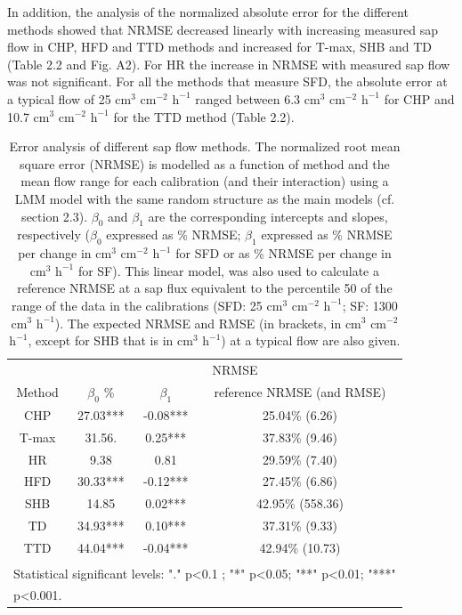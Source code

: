 \documentclass[11pt,twoside]{reedthesis}
\begin{document}
In addition, the analysis of the normalized absolute error for the
different methods showed that NRMSE decreased linearly with increasing
measured sap flow in CHP, HFD and TTD methods and increased for T-max,
SHB and TD (Table 2.2 and Fig. A2). For HR the increase in NRMSE with
measured sap flow was not significant. For all the methods that measure
SFD, the absolute error at a typical flow of 25 \(\text{cm}^3\)
\(\text{cm}^{-2}\) \(\text{h}^{-1}\) ranged between 6.3 \(\text{cm}^3\)
\(\text{cm}^{-2}\) \(\text{h}^{-1}\) for CHP and 10.7 \(\text{cm}^3\)
\(\text{cm}^{-2}\) \(\text{h}^{-1}\) for the TTD method (Table 2.2).\par
\begin{table}

\caption[Error analysis of different sap flow methods.]{\label{tab:Ch2T2}Error analysis of different sap flow methods. The normalized root mean square error (NRMSE) is modelled as a function of method and the mean flow range for each calibration (and their interaction) using a LMM model with the same random structure as the main models (cf. section 2.3). $\beta_0$ and $\beta_1$ are the corresponding intercepts and slopes, respectively ($\beta_0$ expressed as \% NRMSE; $\beta_1$ expressed as \% NRMSE per change in $\text{cm}^3$ $\text{cm}^{-2}$ $\text{h}^{-1}$ for SFD or as \% NRMSE per change in $\text{cm}^3$ $\text{h}^{-1}$ for SF). This linear model, was also used to calculate a reference NRMSE at a sap flux equivalent to the percentile 50 of the range of the data in the calibrations (SFD: 25 $\text{cm}^3$ $\text{cm}^{-2}$ $\text{h}^{-1}$; SF: 1300 $\text{cm}^3$ $\text{h}^{-1}$). The expected NRMSE and RMSE (in brackets, in $\text{cm}^3$ $\text{cm}^{-2}$ $\text{h}^{-1}$, except for SHB that is in $\text{cm}^3$ $\text{h}^{-1}$) at a typical flow are also given.}
\centering
\fontsize{10}{12}\selectfont
\begin{tabular}[t]{cccc}
\toprule
\multicolumn{1}{c}{ } & \multicolumn{3}{c}{NRMSE} \\
\cmidrule(l{3pt}r{3pt}){2-4}
Method & $\beta_0$\; \% & $\beta_1$ & reference NRMSE (and RMSE)\\
\midrule
CHP & 27.03*** & -0.08*** & 25.04\% (6.26)\\
T-max & 31.56. & 0.25*** & 37.83\% (9.46)\\
HR & 9.38 & 0.81 & 29.59\% (7.40)\\
HFD & 30.33*** & -0.12*** & 27.45\% (6.86)\\
SHB & 14.85 & 0.02*** & 42.95\% (558.36)\\
TD & 34.93*** & 0.10*** & 37.31\% (9.33)\\
TTD & 44.04*** & -0.04*** & 42.94\% (10.73)\\
\bottomrule
\multicolumn{4}{l}{\textsuperscript{} Statistical significant levels: "." p<0.1 ; "*" p<0.05; "**" p<0.01; "***"}\\
\multicolumn{4}{l}{p<0.001.}\\
\end{tabular}
\end{table}
\end{document}
